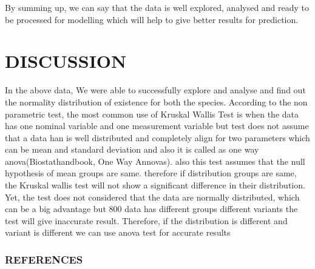 \documentclass[
]{article}
\begin{document}
By summing up, we can say that the data is well explored, analysed and
ready to be processed for modelling which will help to give better
results for prediction.

\hypertarget{discussion}{%
\section{DISCUSSION}\label{discussion}}

In the above data, We were able to successfully explore and analyse and
find out the normality distribution of existence for both the species.
According to the non parametric test, the most common use of Kruskal
Wallis Test is when the data has one nominal variable and one
measurement variable but test does not assume that a data han is well
distributed and completely align for two parameters which can be mean
and standard deviation and also it is called as one way
anova(Biostathandbook, One Way Annovas). also this test assumes that the
null hypothesis of mean groups are same. therefore if distribution
groups are same, the Kruskal wallis test will not show a significant
difference in their distribution. Yet, the test does not considered that
the data are normally distributed, which can be a big advantage but 800
data has different groups different variants the test will give
inaccurate result. Therefore, if the distribution is different and
variant is different we can use anova test for accurate results

\hypertarget{references}{%
\subsubsection{REFERENCES}\label{references}}
\end{document}

